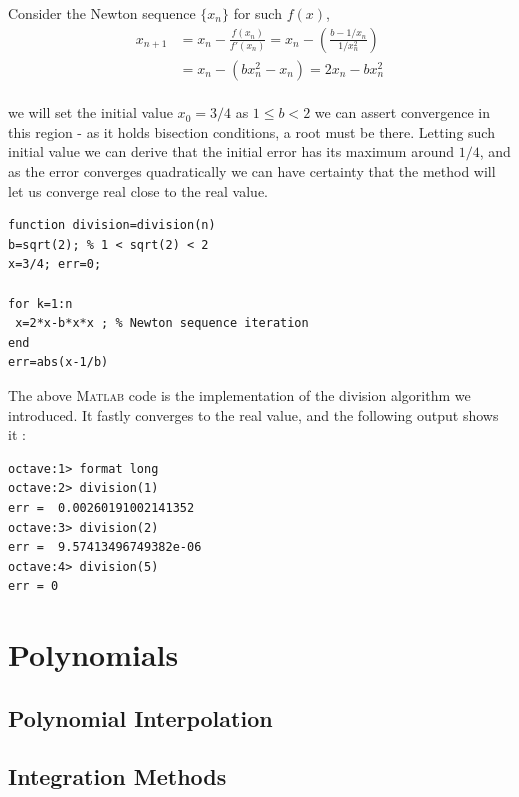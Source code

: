 \documentclass[paper=a4, fontsize=11pt]{scrartcl}
\newcommand{\MATLAB}{\textsc{Matlab}\xspace}
\begin{document}
Consider the Newton sequence $\{x_n\}$ for such $f(x)$, \\

\begin{equation}\nonumber
\begin{split}
		x_{n+1} &= x_n - \frac{f(x_n)}{f'(x_n)} = x_n - \left( \frac{b- 1/x_n}{1/x_n^2}\right) \\[1.5ex]
		&= x_n - (bx_n^2 -x_n) = 2x_n - bx_n^2
\end{split}
\end{equation}\\

we will set the initial value $x_0=3/4$ as $1\leq b <2$ we can assert convergence in this region - as it holds bisection conditions, a root must be there. Letting such initial value we can derive that the initial error has its maximum around $1/4$, and as the error converges quadratically we can have certainty that the method will let us converge real close to the real value.

\vspace{0.15in}
\begin{lstlisting}[caption=division.m]
function division=division(n) 
b=sqrt(2); % 1 < sqrt(2) < 2
x=3/4; err=0;

for k=1:n
 x=2*x-b*x*x ; % Newton sequence iteration
end
err=abs(x-1/b)
\end{lstlisting}
\vspace{0.15in}

The above \MATLAB code is the implementation of the division algorithm we introduced. It fastly converges to the real value, and the following output shows it :

\begin{verbatim}
octave:1> format long
octave:2> division(1)
err =  0.00260191002141352
octave:3> division(2)
err =  9.57413496749382e-06
octave:4> division(5)
err = 0
\end{verbatim}

\vspace{0.15in}

\section{Polynomials}

\subsection{Polynomial Interpolation}

\subsection{Integration Methods}
\end{document}
